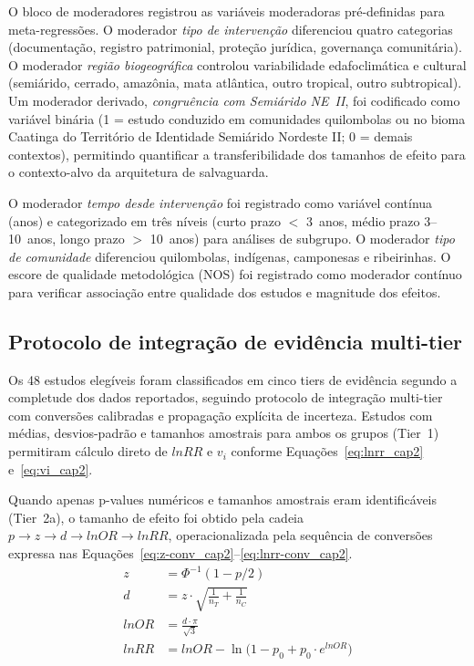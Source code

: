 O bloco de moderadores registrou as variáveis moderadoras pré-definidas para meta-regressões. O moderador \textit{tipo de intervenção} diferenciou quatro categorias (documentação, registro patrimonial, proteção jurídica, governança comunitária). O moderador \textit{região biogeográfica} controlou variabilidade edafoclimática e cultural (semiárido, cerrado, amazônia, mata atlântica, outro tropical, outro subtropical). Um moderador derivado, \textit{congruência com Semiárido NE~II}, foi codificado como variável binária (1 = estudo conduzido em comunidades quilombolas ou no bioma Caatinga do Território de Identidade Semiárido Nordeste II; 0 = demais contextos), permitindo quantificar a transferibilidade dos tamanhos de efeito para o contexto-alvo da arquitetura de salvaguarda.

O moderador \textit{tempo desde intervenção} foi registrado como variável contínua (anos) e categorizado em três níveis (curto prazo $<$ 3~anos, médio prazo 3--10~anos, longo prazo $>$ 10~anos) para análises de subgrupo. O moderador \textit{tipo de comunidade} diferenciou quilombolas, indígenas, camponesas e ribeirinhas. O escore de qualidade metodológica (NOS) foi registrado como moderador contínuo para verificar associação entre qualidade dos estudos e magnitude dos efeitos.

\subsection{Protocolo de integração de evidência multi-tier}
\label{sec:multitier_cap2}

Os 48 estudos elegíveis foram classificados em cinco tiers de evidência segundo a completude dos dados reportados, seguindo protocolo de integração multi-tier com conversões calibradas e propagação explícita de incerteza. Estudos com médias, desvios-padrão e tamanhos amostrais para ambos os grupos (Tier~1) permitiram cálculo direto de $lnRR$ e $v_i$ conforme Equações~\ref{eq:lnrr_cap2} e~\ref{eq:vi_cap2}.

Quando apenas p-values numéricos e tamanhos amostrais eram identificáveis (Tier~2a), o tamanho de efeito foi obtido pela cadeia $p \rightarrow z \rightarrow d \rightarrow lnOR \rightarrow lnRR$, operacionalizada pela sequência de conversões expressa nas Equações~\ref{eq:z-conv_cap2}--\ref{eq:lnrr-conv_cap2}.
%
\begin{align}
z &= \Phi^{-1}(1 - p/2) \label{eq:z-conv_cap2} \\
d &= z \cdot \sqrt{\frac{1}{n_T} + \frac{1}{n_C}} \label{eq:d-conv_cap2} \\
lnOR &= \frac{d \cdot \pi}{\sqrt{3}} \label{eq:lnor-conv_cap2} \\
lnRR &= lnOR - \ln\!\bigl(1 - p_0 + p_0 \cdot e^{lnOR}\bigr) \label{eq:lnrr-conv_cap2}
\end{align}

